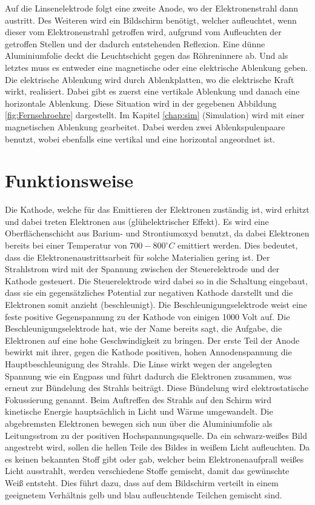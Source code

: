 Auf die Linsenelektrode folgt eine zweite Anode, wo der Elektronenstrahl dann austritt.
Des Weiteren wird ein Bildschirm benötigt, welcher aufleuchtet, wenn dieser vom Elektronenstrahl getroffen wird, aufgrund vom Aufleuchten der getroffen Stellen und der dadurch entstehenden Reflexion.
Eine dünne Aluminiumfolie deckt die Leuchtschicht gegen das Röhreninnere ab.
Und als letztes muss es entweder eine magnetische oder eine elektrische Ablenkung geben.
Die elektrische Ablenkung wird durch Ablenkplatten, wo die elektrische Kraft wirkt, realisiert.
Dabei gibt es zuerst eine vertikale Ablenkung und danach eine horizontale Ablenkung.
Diese Situation wird in der gegebenen Abbildung \ref{fig:Fernsehroehre} dargestellt.
Im Kapitel \ref{chap:sim} (Simulation) wird mit einer magnetischen Ablenkung gearbeitet.
Dabei werden zwei Ablenkspulenpaare benutzt, wobei ebenfalls eine vertikal und eine horizontal angeordnet ist.

\section{Funktionsweise}
\label{sec:Funktionsweise}
Die Kathode, welche für das Emittieren der Elektronen zuständig ist, wird erhitzt und dabei treten Elektronen aus (glühelektrischer Effekt).
Es wird eine Oberflächenschicht aus Barium- und Strontiumoxyd benutzt, da  dabei Elektronen bereits bei einer Temperatur von $700-800 ^\circ C$ emittiert werden.
Dies bedeutet, dass die Elektronenaustrittsarbeit für solche Materialien gering ist.
Der Strahlstrom wird mit der Spannung zwischen der Steuerelektrode und der Kathode gesteuert.
Die Steuerelektrode wird dabei so in die Schaltung eingebaut, dass sie ein gegensätzliches Potential zur negativen Kathode darstellt und die Elektronen somit anzieht (beschleunigt).
Die Beschleunigungselektrode weist eine feste positive Gegenspannung zu der Kathode von einigen 1000 Volt auf. 
Die Beschleunigungselektrode hat, wie der Name bereits sagt, die Aufgabe, die Elektronen auf eine hohe Geschwindigkeit zu bringen.
Der erste Teil der Anode bewirkt mit ihrer, gegen die Kathode positiven, hohen Annodenspannung die Hauptbeschleunigung des Strahls.
Die Linse wirkt wegen der angelegten Spannung wie ein Engpass und führt dadurch die Elektronen zusammen, was erneut zur Bündelung des Strahls beiträgt.
Diese Bündelung wird elektrostatische Fokussierung genannt.
Beim Auftreffen des Strahls auf den Schirm wird kinetische Energie hauptsächlich in Licht und Wärme umgewandelt.
Die abgebremsten Elektronen bewegen sich nun über die Aluminiumfolie als Leitungsstrom zu der positiven Hochspannungsquelle.
Da ein schwarz-weißes Bild angestrebt wird, sollen die hellen Teile des Bildes in weißem Licht aufleuchten.
Da es keinen bekannten Stoff gibt oder gab, welcher beim Elektronenaufprall weißes Licht ausstrahlt, werden verschiedene Stoffe gemischt, damit das gewünschte Weiß entsteht.
Dies führt dazu, dass auf dem Bildschirm verteilt in einem geeignetem Verhältnis gelb und blau aufleuchtende Teilchen gemischt sind.

